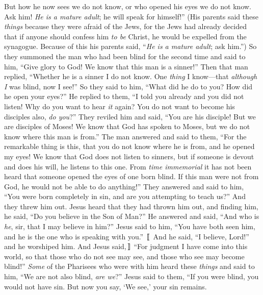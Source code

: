 \begin{biblechapter}
\verse But how he now sees we do not know, or who opened his eyes we do not know. Ask him! \textit{He is a mature adult}; he will speak for himself!”
\verse (His parents said these \textit{things} because they were afraid of the Jews, for the Jews had already decided that if anyone should confess him \textit{to be} Christ, he would be expelled from the synagogue.
\verse Because of this his parents said, “\textit{He is a mature adult}; ask him.”)
\verse So they summoned the man who had been blind for the second time and said to him, “Give glory to God! We know that this man is a sinner!”
\verse Then that man replied, “Whether he is a sinner I do not know. One \textit{thing} I know—that \textit{although I} was blind, now I see!”
\verse So they said to him, “What did he do to you? How did he open your eyes?”
\verse He replied to them, “I told you already and you did not listen! Why do you want to hear \textit{it} again? You do not want to become his disciples also, \textit{do you}?”
\verse They reviled him and said, “You are his disciple! But we are disciples of Moses!
\verse We know that God has spoken to Moses, but we do not know where this man is from.”
\verse The man answered and said to them, “For the remarkable thing is this, that you do not know where he is from, and he opened my eyes!
\verse We know that God does not listen to sinners, but if someone is devout and does his will, he listens to this one.
\verse From \textit{time immemorial} it has not been heard that someone opened the eyes of one born blind.
\verse If this man were not from God, he would not be able to do anything!”
\verse They answered and said to him, “You were born completely in sin, and are you attempting to teach us?” And they threw him out.
 Jesus heard that they had thrown him out, and finding him, he said, “Do you believe in the Son of Man?”
\verse He answered and said, “And who is \textit{he}, sir, that I may believe in him?”
\verse Jesus said to him, “You have both seen him, and he is the one who is speaking with you.” 〚
\verse And he said, “I believe, Lord!” and he worshiped him.
\verse And Jesus said,〛 “For judgment I have come into this world, so that those who do not see may see, and those who see may become blind!”
\verse \textit{Some} of the Pharisees who were with him heard these \textit{things} and said to him, “We are not also blind, \textit{are we}?”
\verse Jesus said to them, “If you were blind, you would not have sin. But now you say, ‘We see,’ your sin remains.
\end{biblechapter}

